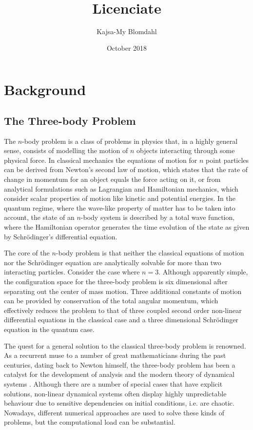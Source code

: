 \documentclass{article}
\title{Licenciate}
\author{Kajsa-My Blomdahl}
\date{October 2018}
\numberwithin{equation}{section}
\begin{document}
\maketitle

\tableofcontents

\section{Background}
\subsection{The Three-body Problem}
The $n$-body problem is a class of problems in physics that, in a highly general sense, consists of modelling the motion of $n$ objects interacting through some physical force. In classical mechanics the equations of motion for $n$ point particles can be derived from Newton's second law of motion, which states that the rate of change in momentum for an object equals the force acting on it, or from analytical formulations such as Lagrangian and Hamiltonian mechanics, which consider scalar properties of motion like kinetic and potential energies. In the quantum regime, where the wave-like property of matter has to be taken into account, the state of an $n$-body system is described by a total wave function, where the Hamiltonian operator generates the time evolution of the state as given by Schr{\"o}dinger's differential equation.

The core of the $n$-body problem is that neither the classical equations of motion nor the Schr{\"o}dinger equation are analytically solvable for more than two interacting particles. Consider the case where $n=3$. Although apparently simple, the configuration space for the three-body problem is six dimensional after separating out the center of mass motion. Three additional constants of motion can be provided by conservation of the total angular momentum, which effectively reduces the problem to that of three coupled second order non-linear differential equations in the classical case and a three dimensional Schr{\"o}dinger equation in the quantum case. 

The quest for a general solution to the classical three-body problem is renowned. As a recurrent muse to a number of great mathematicians during the past centuries, dating back to Newton himself, the three-body problem has been a catalyst for the development of analysis and the modern theory of dynamical systems \cite{Chenciner2015}. Although there are a number of special cases that have explicit solutions, non-linear dynamical systems often display highly unpredictable behaviour due to sensitive dependencies on initial conditions, i.e. are chaotic. Nowadays, different numerical approaches are used to solve these kinds of problems, but the computational load can be substantial. 
\end{document}
